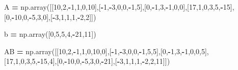 \documentclass[
]{article}
\newenvironment{Shaded}{\begin{snugshade}}{\end{snugshade}}
\newcommand{\DecValTok}[1]{\textcolor[rgb]{0.00,0.00,0.81}{#1}}
\newcommand{\NormalTok}[1]{#1}
\newcommand{\OperatorTok}[1]{\textcolor[rgb]{0.81,0.36,0.00}{\textbf{#1}}}
\begin{document}
\begin{Shaded}
\begin{Highlighting}[]
\NormalTok{A }\OperatorTok{=}\NormalTok{ np.array([[}\DecValTok{10}\NormalTok{,}\DecValTok{2}\NormalTok{,}\OperatorTok{-}\DecValTok{1}\NormalTok{,}\DecValTok{1}\NormalTok{,}\DecValTok{0}\NormalTok{,}\DecValTok{10}\NormalTok{],[}\OperatorTok{-}\DecValTok{1}\NormalTok{,}\OperatorTok{-}\DecValTok{3}\NormalTok{,}\DecValTok{0}\NormalTok{,}\DecValTok{0}\NormalTok{,}\OperatorTok{-}\DecValTok{1}\NormalTok{,}\DecValTok{5}\NormalTok{],[}\DecValTok{0}\NormalTok{,}\OperatorTok{-}\DecValTok{1}\NormalTok{,}\DecValTok{3}\NormalTok{,}\OperatorTok{-}\DecValTok{1}\NormalTok{,}\DecValTok{0}\NormalTok{,}\DecValTok{0}\NormalTok{],[}\DecValTok{17}\NormalTok{,}\DecValTok{1}\NormalTok{,}\DecValTok{0}\NormalTok{,}\DecValTok{3}\NormalTok{,}\DecValTok{5}\NormalTok{,}\OperatorTok{-}\DecValTok{15}\NormalTok{],[}\DecValTok{0}\NormalTok{,}\OperatorTok{-}\DecValTok{10}\NormalTok{,}\DecValTok{0}\NormalTok{,}\OperatorTok{-}\DecValTok{5}\NormalTok{,}\DecValTok{3}\NormalTok{,}\DecValTok{0}\NormalTok{],[}\OperatorTok{-}\DecValTok{3}\NormalTok{,}\DecValTok{1}\NormalTok{,}\DecValTok{1}\NormalTok{,}\DecValTok{1}\NormalTok{,}\OperatorTok{-}\DecValTok{2}\NormalTok{,}\DecValTok{2}\NormalTok{]])}

\NormalTok{b }\OperatorTok{=}\NormalTok{ np.array([}\DecValTok{0}\NormalTok{,}\DecValTok{5}\NormalTok{,}\DecValTok{5}\NormalTok{,}\DecValTok{4}\NormalTok{,}\OperatorTok{-}\DecValTok{21}\NormalTok{,}\DecValTok{11}\NormalTok{])}

\NormalTok{AB }\OperatorTok{=}\NormalTok{ np.array([[}\DecValTok{10}\NormalTok{,}\DecValTok{2}\NormalTok{,}\OperatorTok{-}\DecValTok{1}\NormalTok{,}\DecValTok{1}\NormalTok{,}\DecValTok{0}\NormalTok{,}\DecValTok{10}\NormalTok{,}\DecValTok{0}\NormalTok{],[}\OperatorTok{-}\DecValTok{1}\NormalTok{,}\OperatorTok{-}\DecValTok{3}\NormalTok{,}\DecValTok{0}\NormalTok{,}\DecValTok{0}\NormalTok{,}\OperatorTok{-}\DecValTok{1}\NormalTok{,}\DecValTok{5}\NormalTok{,}\DecValTok{5}\NormalTok{],[}\DecValTok{0}\NormalTok{,}\OperatorTok{-}\DecValTok{1}\NormalTok{,}\DecValTok{3}\NormalTok{,}\OperatorTok{-}\DecValTok{1}\NormalTok{,}\DecValTok{0}\NormalTok{,}\DecValTok{0}\NormalTok{,}\DecValTok{5}\NormalTok{],[}\DecValTok{17}\NormalTok{,}\DecValTok{1}\NormalTok{,}\DecValTok{0}\NormalTok{,}\DecValTok{3}\NormalTok{,}\DecValTok{5}\NormalTok{,}\OperatorTok{-}\DecValTok{15}\NormalTok{,}\DecValTok{4}\NormalTok{],[}\DecValTok{0}\NormalTok{,}\OperatorTok{-}\DecValTok{10}\NormalTok{,}\DecValTok{0}\NormalTok{,}\OperatorTok{-}\DecValTok{5}\NormalTok{,}\DecValTok{3}\NormalTok{,}\DecValTok{0}\NormalTok{,}\OperatorTok{-}\DecValTok{21}\NormalTok{],[}\OperatorTok{-}\DecValTok{3}\NormalTok{,}\DecValTok{1}\NormalTok{,}\DecValTok{1}\NormalTok{,}\DecValTok{1}\NormalTok{,}\OperatorTok{-}\DecValTok{2}\NormalTok{,}\DecValTok{2}\NormalTok{,}\DecValTok{11}\NormalTok{]])}
\end{Highlighting}
\end{Shaded}
\end{document}
